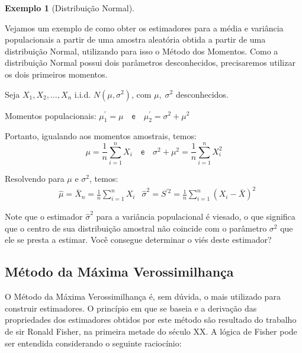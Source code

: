 \documentclass[
]{book}
\theoremstyle{definition}
\theoremstyle{definition}
\newtheorem{example}{Exemplo}[chapter]
\theoremstyle{definition}
\theoremstyle{remark}
\begin{document}
\begin{example}[Distribuição Normal]
\protect\hypertarget{exm:unnamed-chunk-11}{}{\label{exm:unnamed-chunk-11} {} }
\end{example}

Vejamos um exemplo de como obter os estimadores para a média e variância populacionais a partir de uma amostra aleatória obtida a partir de uma distribuição Normal, utilizando para isso o Método dos Momentos. Como a distribuição Normal possui dois parâmetros desconhecidos, precisaremos utilizar os dois primeiros momentos.

Seja \(X_1, X_2, \ldots, X_n\) i.i.d. \(N(\mu, \sigma^2)\), com \(\mu,\; \sigma^2\) desconhecidos.

Momentos populacionais: \(\mu_1^\prime = \mu \quad \textsf{e} \quad \mu_2^\prime = \sigma^2 + \mu^2\)

Portanto, igualando aos momentos amostrais, temos:
\[\mu = \frac{1}{n} \sum_{i=1}^n X_i \quad \textsf{e} \quad \sigma^2 + \mu^2 = \frac{1}{n} \sum_{i=1}^n X_i^2\]

Resolvendo para \(\mu\) e \(\sigma^2\), temos:\\
\begin{align*}
&\hat{\mu} = \bar{X}_n = \frac{1}{n} \sum_{i=1}^n X_i 
&\hat{\sigma}^2 = S^{\prime 2} = \frac{1}{n} \sum_{i=1}^n (X_i - \bar{X})^2
\end{align*}

Note que o estimador \(\hat\sigma^2\) para a variância populacional é viesado, o que significa que o centro de sua distribuição amostral não coincide com o parâmetro \(\sigma^2\) que ele se presta a estimar. Você consegue determinar o viés deste estimador?

\hypertarget{muxe9todo-da-muxe1xima-verossimilhanuxe7a}{%
\subsection*{Método da Máxima Verossimilhança}\label{muxe9todo-da-muxe1xima-verossimilhanuxe7a}}

O Método da Máxima Verossimilhança é, sem dúvida, o mais utilizado para construir estimadores. O princípio em que se baseia e a derivação das propriedades dos estimadores obtidos por este método são resultado do trabalho de sir Ronald Fisher, na primeira metade do século XX. A lógica de Fisher pode ser entendida considerando o seguinte raciocínio:
\end{document}
